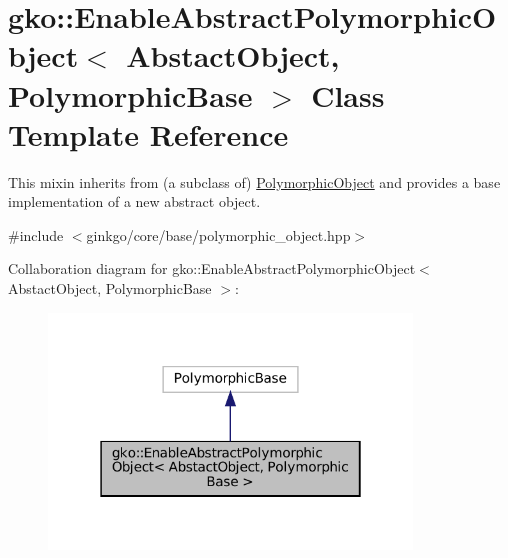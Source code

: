 \hypertarget{classgko_1_1EnableAbstractPolymorphicObject}{}\section{gko\+:\+:Enable\+Abstract\+Polymorphic\+Object$<$ Abstact\+Object, Polymorphic\+Base $>$ Class Template Reference}
\label{classgko_1_1EnableAbstractPolymorphicObject}


This mixin inherits from (a subclass of) \hyperlink{classgko_1_1PolymorphicObject}{Polymorphic\+Object} and provides a base implementation of a new abstract object.  




{\ttfamily \#include $<$ginkgo/core/base/polymorphic\+\_\+object.\+hpp$>$}



Collaboration diagram for gko\+:\+:Enable\+Abstract\+Polymorphic\+Object$<$ Abstact\+Object, Polymorphic\+Base $>$\+:
\nopagebreak
\begin{figure}[H]
\begin{center}
\leavevmode
\includegraphics[width=274pt]{classgko_1_1EnableAbstractPolymorphicObject__coll__graph}
\end{center}
\end{figure}

